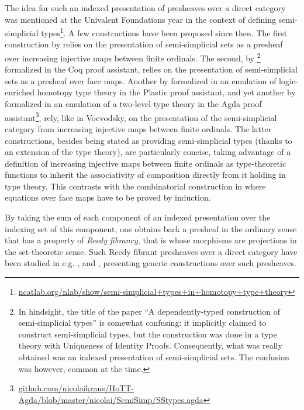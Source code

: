 \documentclass{msc}
\begin{document}
The idea for such an indexed presentation of presheaves over a direct category was mentioned at the Univalent Foundations year in the context of defining semi-simplicial types\footnote{\href{https://ncatlab.org/nlab/show/semi-simplicial+types+in+homotopy+type+theory}{ncatlab.org/nlab/show/semi-simplicial+types+in+homotopy+type+theory}}. A few constructions have been proposed since then. The first construction by \cite{voevodsky12} relies on the presentation of semi-simplicial sets as a presheaf over increasing injective maps between finite ordinals. The second, by \cite{herbelin15}\footnote{In hindsight, the title of the paper ``A dependently-typed construction of semi-simplicial types'' is somewhat confusing: it implicitly claimed to construct semi-simplicial types, but the construction was done in a type theory with Uniqueness of Identity Proofs. Consequently, what was really obtained was an indexed presentation of semi-simplicial sets. The confusion was however, common at the time.} formalized in the Coq proof assistant, relies on the presentation of semi-simplicial sets as a presheaf over face maps. Another by \cite{part15} formalized in an emulation of logic-enriched homotopy type theory in the Plastic proof assistant, and yet another by \cite{altenkirch16} formalized in an emulation of a two-level type theory in the Agda proof assistant\footnote{\href{https://github.com/nicolaikraus/HoTT-Agda/blob/master/nicolai/SemiSimp/SStypes.agda}{github.com/nicolaikraus/HoTT-Agda/blob/master/nicolai/SemiSimp/SStypes.agda}}, rely, like in Voevodsky, on the presentation of the semi-simplicial category from increasing injective maps between finite ordinals. The latter constructions, besides being stated as providing semi-simplicial types (thanks to an extension of the type theory), are particularly concise, taking advantage of a definition of increasing injective maps between finite ordinals as type-theoretic functions to inherit the associativity of composition directly from it holding in type theory. This contrasts with the combinatorial construction in \cite{herbelin15} where equations over face maps have to be proved by induction.

By taking the sum of each component of an indexed presentation over the indexing set of this component, one obtains back a presheaf in the ordinary sense that has a property of \emph{Reedy fibrancy}, that is whose morphisms are projections in the set-theoretic sense. Such Reedy fibrant presheaves over a direct category have been studied in e.g. \cite{shulman15}, \cite{kraus17} and \cite{annenkovCK17,AnnenkovCKS2023}, presenting generic constructions over such presheaves.
\end{document}
